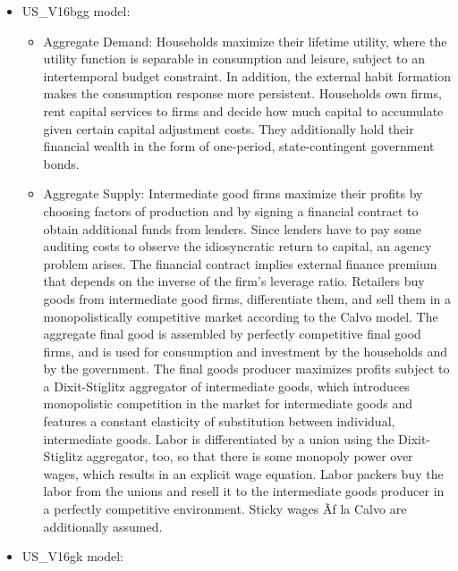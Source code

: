 \documentclass[11pt,a4paper]{article}
\begin{document}
	
	\begin{itemize}
		
		\item US\_V16bgg model:
		
		\begin{itemize}	
			
			\item Aggregate Demand: Households maximize their lifetime utility, where the utility function is separable in consumption and leisure, subject to an intertemporal budget constraint. In addition, the external habit formation makes the consumption response more persistent. Households own firms, rent capital services to firms and decide how much capital to accumulate given certain capital adjustment costs. They additionally hold their financial wealth in the form of one-period, state-contingent government bonds.
			
			\item Aggregate Supply: Intermediate good firms maximize their profits by choosing factors of production and by signing a financial contract to obtain additional funds from lenders. Since lenders have to pay some auditing costs to observe the idiosyncratic return to capital, an agency problem arises. The financial contract implies external finance premium that depends on the inverse of the firm's leverage ratio. Retailers buy goods from intermediate good firms, differentiate them, and sell them in a monopolistically competitive market according to the Calvo model. The aggregate final good is assembled by perfectly competitive final good firms, and is used for consumption and investment by the households and by the government. The final goods producer maximizes profits subject to a Dixit-Stiglitz aggregator of intermediate goods, which introduces monopolistic competition in the market for intermediate goods and features a constant elasticity of substitution between individual, intermediate goods. Labor is differentiated by a union using the Dixit-Stiglitz aggregator, too, so that there is some monopoly power over wages, which results in an explicit wage equation. Labor packers buy the labor from the unions and resell it to the intermediate goods producer in a perfectly competitive environment. Sticky wages Ãƒ  la Calvo are additionally assumed. 
			
		\end{itemize}
		
		\item US\_V16gk model:
		
		
		\begin{itemize}	
			

\end{itemize}
\end{itemize}
\end{document}
